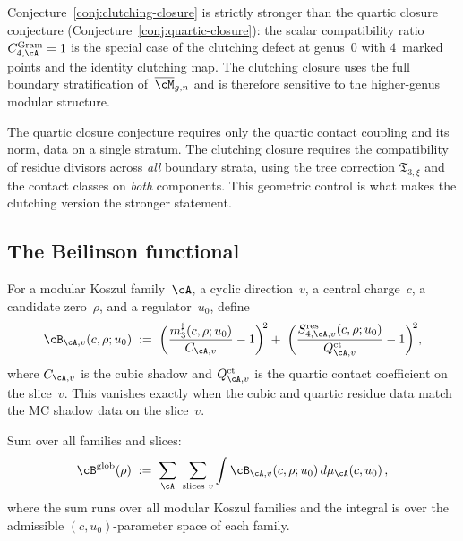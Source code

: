 \begin{remark}%
\label{rem:clutching-vs-quartic-closure}%
%
Conjecture~\ref{conj:clutching-closure} is strictly stronger
than the quartic closure conjecture
(Conjecture~\ref{conj:quartic-closure}):
the scalar compatibility ratio $C_{4,\cA}^{\mathrm{Gram}} = 1$
is the special case of the clutching defect at genus~$0$
with $4$~marked points and the identity clutching map.
The clutching closure uses the full boundary stratification
of~$\overline{\cM}_{g,n}$ and is therefore sensitive to the
higher-genus modular structure.

The quartic closure conjecture
requires only the quartic contact coupling and its
norm, data on a single stratum. The clutching closure
requires the compatibility of residue divisors across
\emph{all} boundary strata, using the tree correction
$\mathfrak{T}_{3,\xi}$ and the contact classes on
\emph{both} components. This geometric control is what makes
the clutching version the stronger statement.
\end{remark}

\subsection{The Beilinson functional}%
\label{sec:beilinson-functional}%

\begin{definition}%
\label{def:local-compatibility-discrepancy}%
%
For a modular Koszul family~$\cA$, a cyclic direction~$v$,
a central charge~$c$, a candidate zero~$\rho$, and a
regulator~$u_0$, define
\begin{equation}\label{eq:local-discrepancy}
\cB_{\cA,v}(c,\rho;u_0)
\;:=\;
\biggl(
\frac{m_3^\sharp(c,\rho;u_0)}{C_{\cA,v}} - 1
\biggr)^{\!2}
+\;
\biggl(
\frac{S_{4,\cA,v}^{\mathrm{res}}(c,\rho;u_0)}
{Q_{\cA,v}^{\mathrm{ct}}} - 1
\biggr)^{\!2},
\end{equation}
where $C_{\cA,v}$ is the cubic shadow and
$Q_{\cA,v}^{\mathrm{ct}}$ is the quartic contact
coefficient on the slice~$v$.
This vanishes exactly when the cubic and quartic residue
data match the MC shadow data on the slice~$v$.
\end{definition}

\begin{definition}%
\label{def:beilinson-functional}%
%
Sum over all families and slices:
\begin{equation}\label{eq:beilinson-functional}
\cB^{\mathrm{glob}}(\rho)
\;:=\;
\sum_{\cA}\;
\sum_{\text{slices }v}
\int
\cB_{\cA,v}(c,\rho;u_0)\,d\mu_\cA(c,u_0)\,,
\end{equation}
where the sum runs over all modular Koszul families
and the integral is over the admissible
$(c,u_0)$-parameter space of each family.
\end{definition}

